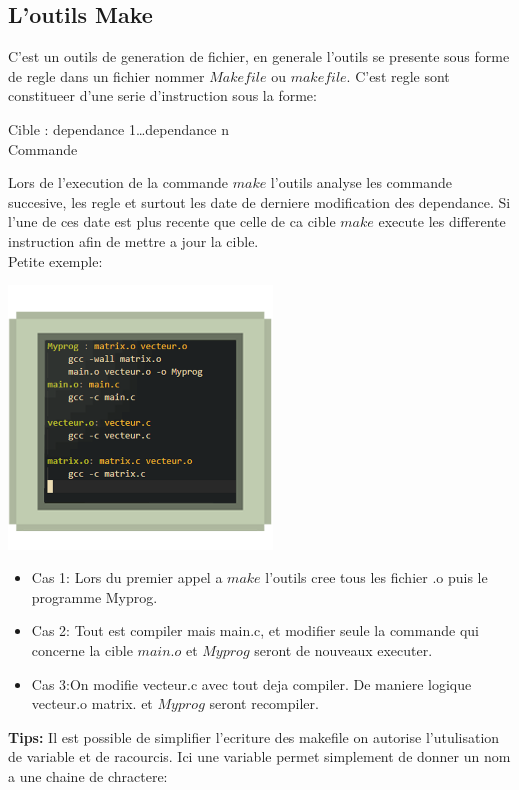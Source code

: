 \documentclass[a4paper,11pt]{article}
\begin{document}
  \subsection{L'outils Make}
  C'est un outils de generation de fichier, en generale l'outils se presente sous forme de regle dans un fichier nommer $Makefile$ ou $makefile$. C'est regle sont constitueer d'une serie d'instruction sous la forme:\\
  \begin{center}
    \color{OrangeHaf}Cible : \color{LightOrangeHaf} dependance 1\ldots dependance n\\
            Commande
  \end{center}
  Lors de l'execution de la commande $make$ l'outils analyse les commande succesive, les regle et surtout les date de derniere modification des dependance.
  Si l'une de ces date est plus recente que celle de ca cible $make$ execute les differente instruction afin de mettre a jour la cible.\\
  Petite exemple:
  \begin{center}
    \includegraphics[width=7cm]{fig4.png}
  \end{center}
  \begin{itemize}
    \item Cas 1: Lors du premier appel a $make$ l'outils cree tous les fichier .o puis le programme Myprog.
    \item Cas 2: Tout est compiler mais main.c, et modifier seule la commande qui concerne la cible $main.o$ et $Myprog$ seront de nouveaux executer.
    \item Cas 3:On modifie vecteur.c avec tout deja compiler. De maniere logique vecteur.o matrix. et $Myprog$ seront recompiler.
  \end{itemize}
  \textbf{Tips:} Il est possible de simplifier l'ecriture des makefile on autorise l'utulisation de variable et de racourcis. Ici une variable permet simplement de donner un nom a une chaine de chractere:
\end{document}
